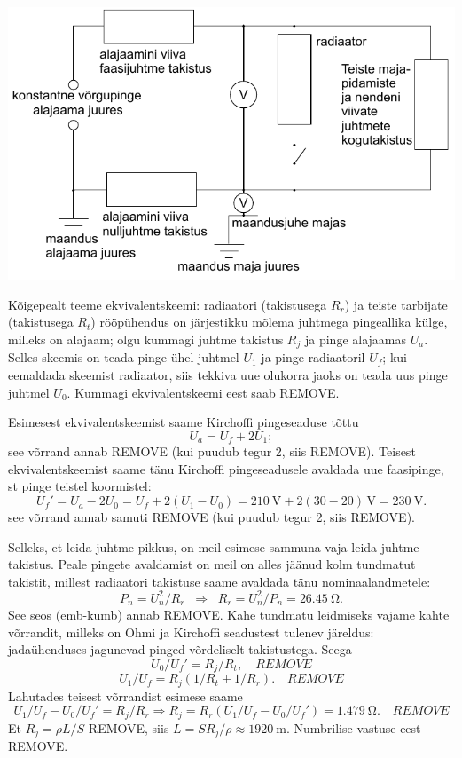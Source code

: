 \documentclass[10pt]{article}
\newcommand{\p}[1]{REMOVE}
\begin{document}

\solu
\begin{center}
    \includegraphics[width=0.8\linewidth]{2023-v2g-10-yl.pdf}
\end{center}

Kõigepealt teeme ekvivalentskeemi: radiaatori (takistusega $R_r$) ja teiste tarbijate (takistusega $R_t$) rööpühendus on järjestikku mõlema juhtmega pingeallika külge, milleks on alajaam; olgu kummagi juhtme takistus $R_j$ ja pinge alajaamas $U_a$. Selles skeemis on teada pinge ühel juhtmel $U_1$ ja pinge radiaatoril $U_f$; kui eemaldada skeemist radiaator, siis tekkiva uue olukorra jaoks on teada uus pinge juhtmel $U_0$. Kummagi ekvivalentskeemi eest saab \p{1}.

Esimesest ekvivalentskeemist saame Kirchoffi pingeseaduse tõttu 
$$U_a=U_f+2U_1;$$
see võrrand annab \p{2} (kui puudub tegur 2, siis \p{1}). 
Teisest ekvivalentskeemist saame tänu Kirchoffi pingeseadusele avaldada uue faasipinge, st pinge teistel koormistel:
$$U_f'=U_a-2U_0=U_f+2(U_1-U_0)=\SI{210}{\V} + 2(30-20)\,\si{\V} = \SI{230}{\V}.$$
see võrrand annab samuti \p{2} (kui puudub tegur 2, siis \p{1}).

Selleks, et leida juhtme pikkus, on meil esimese sammuna vaja leida juhtme takistus. Peale pingete avaldamist on meil on alles jäänud kolm tundmatut takistit, millest radiaatori takistuse saame avaldada tänu nominaalandmetele: 
$$P_n=U_n^2/R_r\;\; \Rightarrow\;\; R_r=U_n^2/P_n=\SI{26.45}{\ohm}.$$
See seos (emb-kumb) annab \p{1}. Kahe tundmatu leidmiseks vajame kahte võrrandit, milleks on Ohmi ja Kirchoffi seadustest tulenev järeldus: jadaühenduses jagunevad pinged võrdeliselt takistustega. Seega
$$U_0/U_f'=R_j/R_t,\quad\p{1}$$
$$U_1/U_f=R_j(1/R_t+1/R_r).\quad\p{1}$$
Lahutades teisest võrrandist esimese saame
$$U_1/U_f-U_0/U_f'=R_j/R_r\Rightarrow R_j=R_r(U_1/U_f-U_0/U_f')=\SI{1.479}{\ohm}.\quad\p{1}$$
Et $R_j=\rho L/S$ \p{1}, siis $L=SR_j/\rho\approx\SI{1920}{\m}$. Numbrilise vastuse eest \p{1}.
\probend
\bigskip
\end{document}
